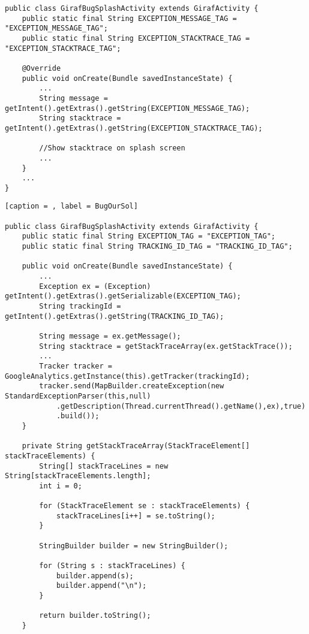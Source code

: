 \begin{minipage}[H]{\linewidth}
\begin{lstlisting}[caption = Code responsible for showing the GIRAF splash screen., label = GSplash]
public class GirafBugSplashActivity extends GirafActivity { 
	public static final String EXCEPTION_MESSAGE_TAG = "EXCEPTION_MESSAGE_TAG"; 
	public static final String EXCEPTION_STACKTRACE_TAG = "EXCEPTION_STACKTRACE_TAG";
	
	@Override
    public void onCreate(Bundle savedInstanceState) {
		...
		String message = getIntent().getExtras().getString(EXCEPTION_MESSAGE_TAG);
        String stacktrace = getIntent().getExtras().getString(EXCEPTION_STACKTRACE_TAG);
        
        //Show stacktrace on splash screen
        ...
    }	
	...
}
\end{lstlisting}
\end{minipage}

\nl

\begin{minipage}[H]{\linewidth}
\begin{lstlisting}[caption = , label = BugOurSol] 

public class GirafBugSplashActivity extends GirafActivity {
	public static final String EXCEPTION_TAG = "EXCEPTION_TAG";
    public static final String TRACKING_ID_TAG = "TRACKING_ID_TAG";
    
	public void onCreate(Bundle savedInstanceState) {
		...
		Exception ex = (Exception) getIntent().getExtras().getSerializable(EXCEPTION_TAG); 
		String trackingId = getIntent().getExtras().getString(TRACKING_ID_TAG);
		
		String message = ex.getMessage();
        String stacktrace = getStackTraceArray(ex.getStackTrace());
        ...
        Tracker tracker = GoogleAnalytics.getInstance(this).getTracker(trackingId);
        tracker.send(MapBuilder.createException(new StandardExceptionParser(this,null)
            .getDescription(Thread.currentThread().getName(),ex),true)
            .build());
    }

	private String getStackTraceArray(StackTraceElement[] stackTraceElements) {
        String[] stackTraceLines = new String[stackTraceElements.length];
        int i = 0;
        
        for (StackTraceElement se : stackTraceElements) {
            stackTraceLines[i++] = se.toString();
        }
        
        StringBuilder builder = new StringBuilder();
        
        for (String s : stackTraceLines) {
            builder.append(s);
            builder.append("\n");
        }
        
        return builder.toString();
    }
		


\end{lstlisting}
\end{minipage}

